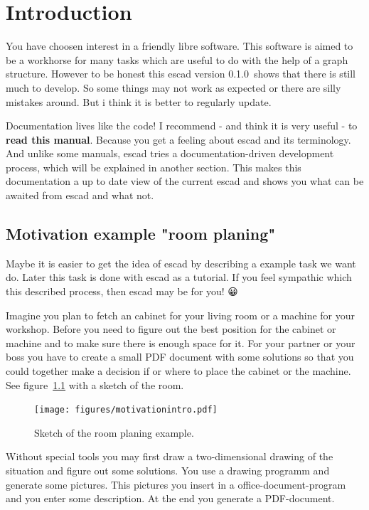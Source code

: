 \documentclass[a4paper, 12pt, openany]{scrbook}
\newcommand{\EscadVersion}{0.1.0}
\begin{document}
\tableofcontents

\chapter{Introduction}
You have choosen interest in a friendly libre software. This software is aimed to be a workhorse for many tasks which are useful to do with the help of a graph structure. However to be honest this escad version \EscadVersion\ shows that there is still much to develop. So some things may not work as expected or there are silly mistakes around. But i think it is better to regularly update.

Documentation lives like the code! I recommend - and think it is very useful - to \textbf{read this manual}. Because you get a feeling about escad and its terminology. And unlike some manuals, escad tries a documentation-driven development process, which will be explained in another section. This makes this documentation a up to date view of the current escad and shows you what can be awaited from escad and what not.
\section{Motivation example "room planing"}
Maybe it is easier to get the idea of escad by describing a example task we want do. Later this task is done with escad as a tutorial. If you feel sympathic which this described process, then escad may be for you! 😀

Imagine you plan to fetch an cabinet for your living room or a machine for your workshop. Before you need to figure out the best position for the cabinet or machine and to make sure there is enough space for it. For your partner or your boss you have to create a small PDF document with some solutions so that you could together make a decision if or where to place the cabinet or the machine. See figure~\ref{fig:motivationintro} with a sketch of the room.
\begin{figure}[htbp]
  \centering
  \texttt{[image: figures/motivationintro.pdf]}
  \caption{Sketch of the room planing example.}
  \label{fig:motivationintro}
\end{figure}
Without special tools you may first draw a two-dimensional drawing of the situation and figure out some solutions. You use a drawing programm and generate some pictures. This pictures you insert in a office-document-program and you enter some description. At the end you generate a PDF-document.
\end{document}
